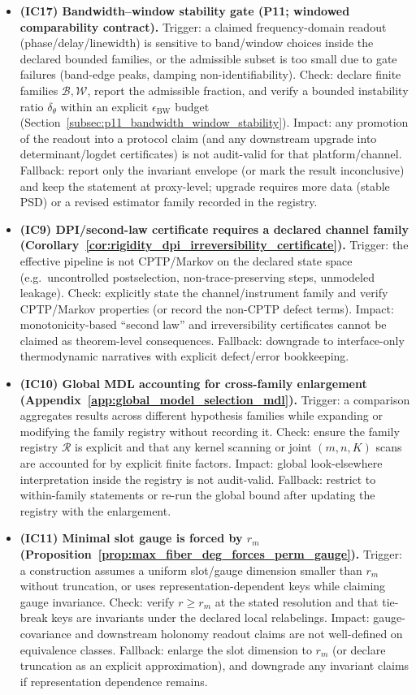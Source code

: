 \begin{itemize}
\item \textbf{(IC17) Bandwidth--window stability gate (P11; windowed comparability contract).}
  Trigger: a claimed frequency-domain readout (phase/delay/linewidth) is sensitive to band/window choices inside the declared bounded families, or the admissible subset is too small due to gate failures (band-edge peaks, damping non-identifiability).
  Check: declare finite families $\mathcal B,\mathcal W$, report the admissible fraction, and verify a bounded instability ratio $\delta_\theta$ within an explicit $\epsilon_{\mathrm{BW}}$ budget (Section~\ref{subsec:p11_bandwidth_window_stability}).
  Impact: any promotion of the readout into a protocol claim (and any downstream upgrade into determinant/logdet certificates) is not audit-valid for that platform/channel.
  Fallback: report only the invariant envelope (or mark the result inconclusive) and keep the statement at proxy-level; upgrade requires more data (stable PSD) or a revised estimator family recorded in the registry.

\item \textbf{(IC9) DPI/second-law certificate requires a declared channel family (Corollary~\ref{cor:rigidity_dpi_irreversibility_certificate}).}
  Trigger: the effective pipeline is not CPTP/Markov on the declared state space (e.g.\ uncontrolled postselection, non-trace-preserving steps, unmodeled leakage).
  Check: explicitly state the channel/instrument family and verify CPTP/Markov properties (or record the non-CPTP defect terms).
  Impact: monotonicity-based ``second law'' and irreversibility certificates cannot be claimed as theorem-level consequences.
  Fallback: downgrade to interface-only thermodynamic narratives with explicit defect/error bookkeeping.

\item \textbf{(IC10) Global MDL accounting for cross-family enlargement (Appendix~\ref{app:global_model_selection_mdl}).}
  Trigger: a comparison aggregates results across different hypothesis families while expanding or modifying the family registry without recording it.
  Check: ensure the family registry $\mathcal{R}$ is explicit and that any kernel scanning or joint $(m,n,K)$ scans are accounted for by explicit finite factors.
  Impact: global look-elsewhere interpretation inside the registry is not audit-valid.
  Fallback: restrict to within-family statements or re-run the global bound after updating the registry with the enlargement.

\item \textbf{(IC11) Minimal slot gauge is forced by $r_m$ (Proposition~\ref{prop:max_fiber_deg_forces_perm_gauge}).}
  Trigger: a construction assumes a uniform slot/gauge dimension smaller than $r_m$ without truncation, or uses representation-dependent keys while claiming gauge invariance.
  Check: verify $r\ge r_m$ at the stated resolution and that tie-break keys are invariants under the declared local relabelings.
  Impact: gauge-covariance and downstream holonomy readout claims are not well-defined on equivalence classes.
  Fallback: enlarge the slot dimension to $r_m$ (or declare truncation as an explicit approximation), and downgrade any invariant claims if representation dependence remains.


\end{itemize}
